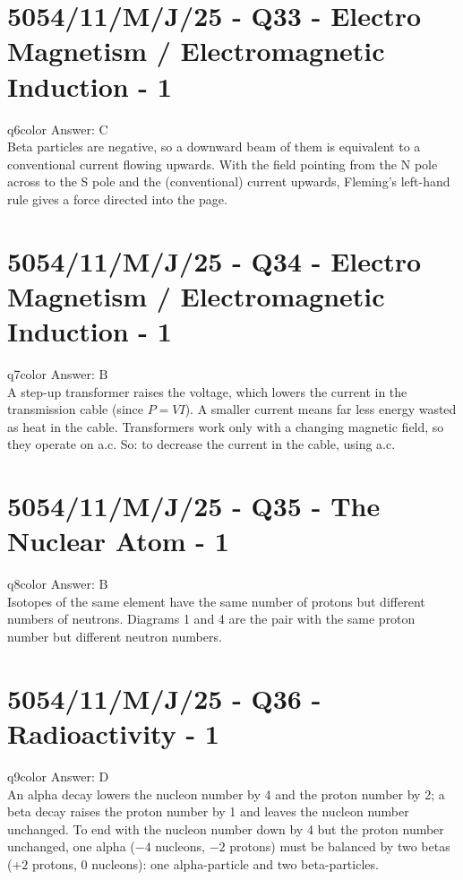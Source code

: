 \documentclass[11pt,a4paper]{article}
\newcommand{\examq}[4]{\section[#1 - Q#2]{#1 - Q#2 - #3 - #4}}
\begin{document}
\examq{5054/11/M/J/25}{33}{Electro Magnetism / Electromagnetic Induction}{1}

\begin{ansbox}{q6color}
Answer: $\boxed{\text{C}}$\\[4pt]
Beta particles are negative, so a downward beam of them is equivalent to a conventional current flowing upwards. With the field pointing from the N pole across to the S pole and the (conventional) current upwards, Fleming's left-hand rule gives a force directed into the page.
\end{ansbox}

\examq{5054/11/M/J/25}{34}{Electro Magnetism / Electromagnetic Induction}{1}

\begin{ansbox}{q7color}
Answer: $\boxed{\text{B}}$\\[4pt]
A step-up transformer raises the voltage, which lowers the current in the transmission cable (since $P = VI$). A smaller current means far less energy wasted as heat in the cable. Transformers work only with a changing magnetic field, so they operate on a.c. So: to decrease the current in the cable, using a.c.
\end{ansbox}

\examq{5054/11/M/J/25}{35}{The Nuclear Atom}{1}

\begin{ansbox}{q8color}
Answer: $\boxed{\text{B}}$\\[4pt]
Isotopes of the same element have the same number of protons but different numbers of neutrons. Diagrams 1 and 4 are the pair with the same proton number but different neutron numbers.
\end{ansbox}

\examq{5054/11/M/J/25}{36}{Radioactivity}{1}

\begin{ansbox}{q9color}
Answer: $\boxed{\text{D}}$\\[4pt]
An alpha decay lowers the nucleon number by 4 and the proton number by 2; a beta decay raises the proton number by 1 and leaves the nucleon number unchanged. To end with the nucleon number down by 4 but the proton number unchanged, one alpha ($-4$ nucleons, $-2$ protons) must be balanced by two betas ($+2$ protons, $0$ nucleons): one alpha-particle and two beta-particles.
\end{ansbox}
\end{document}
